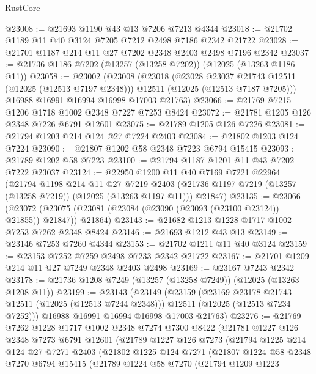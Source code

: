 \begin{lexlean}{RustCore}
\begin{coremodule}
@23008 := @21693 @1190 @43 @13 @7206 @7213 @4344
@23018 := @21702 @1189 @11 @40 @3124 @7205 @7212 @2498 @7186 @2342 @21722
@23028 := @21701 @1187 @214 @11 @27 @7202 @2348 @2403 @2498 @7196 @2342
@23037 := @21736 @1186 @7202 (@13257 (@13258 @7202)) (@12025 (@13263 @1186 @11))
@23058 := @23002
    (@23008
      (@23018
        (@23028 @23037 @21743 @12511 (@12025 (@12513 @7197 @2348)))
        @12511
        (@12025 (@12513 @7187 @7205)))
      @16988
      @16991
      @16994
      @16998
      @17003
      @21763)
@23066 := @21769 @7215 @1206 @1718 @1002 @2348 @7227 @7253 @8424
@23072 := @21781 @1205 @126 @2348 @7226 @6791 @12601
@23075 := @21789 @1205 @126 @7226
@23081 := @21794 @1203 @214 @124 @27 @7224 @2403
@23084 := @21802 @1203 @124 @7224
@23090 := @21807 @1202 @58 @2348 @7223 @6794 @15415
@23093 := @21789 @1202 @58 @7223
@23100 := @21794 @1187 @1201 @11 @43 @7202 @7222 @23037
@23124 := @22950
    @1200
    @11
    @40
    @7169
    @7221
    @22964
    (@21794
      @1198
      @214
      @11
      @27
      @7219
      @2403
      (@21736 @1197 @7219 (@13257 (@13258 @7219)) (@12025 (@13263 @1197 @11)))
      @21847)
@23135 := @23066
    (@23072 (@23075 (@23081 (@23084 (@23090 (@23093 (@23100 @23124)) @21855)) @21847)) @21864)
@23143 := @21682 @1213 @1228 @1717 @1002 @7253 @7262 @2348 @8424
@23146 := @21693 @1212 @43 @13
@23149 := @23146 @7253 @7260 @4344
@23153 := @21702 @1211 @11 @40 @3124
@23159 := @23153 @7252 @7259 @2498 @7233 @2342 @21722
@23167 := @21701 @1209 @214 @11 @27 @7249 @2348 @2403 @2498
@23169 := @23167 @7243 @2342
@23178 := @21736 @1208 @7249 (@13257 (@13258 @7249)) (@12025 (@13263 @1208 @11))
@23199 := @23143
    (@23149
      (@23159
        (@23169 @23178 @21743 @12511 (@12025 (@12513 @7244 @2348)))
        @12511
        (@12025 (@12513 @7234 @7252)))
      @16988
      @16991
      @16994
      @16998
      @17003
      @21763)
@23276 := @21769
    @7262
    @1228
    @1717
    @1002
    @2348
    @7274
    @7300
    @8422
    (@21781
      @1227
      @126
      @2348
      @7273
      @6791
      @12601
      (@21789
        @1227
        @126
        @7273
        (@21794
          @1225
          @214
          @124
          @27
          @7271
          @2403
          (@21802
            @1225
            @124
            @7271
            (@21807
              @1224
              @58
              @2348
              @7270
              @6794
              @15415
              (@21789
                @1224
                @58
                @7270
                (@21794
                  @1209
                  @1223

\end{coremodule}
\end{lexlean}
